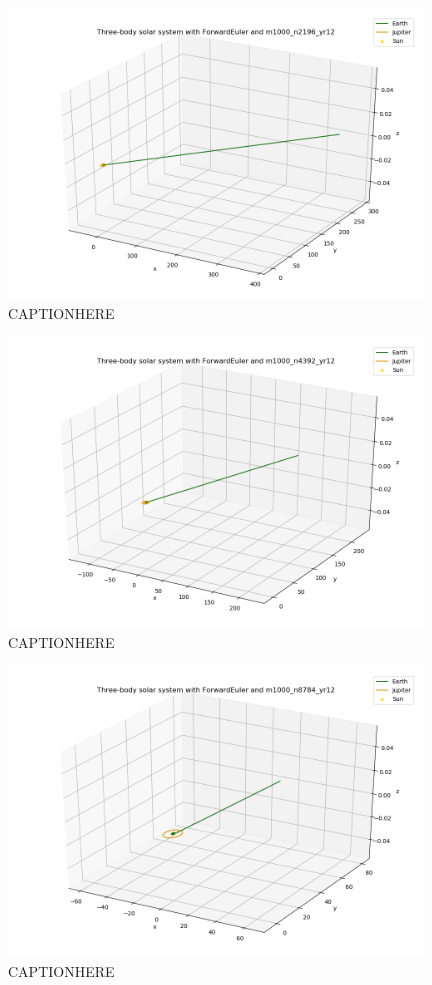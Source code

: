 \documentclass{article}
\begin{document}
    \begin{figure}[H]
        \centering
        \includegraphics[width = 11cm]{img/plot3D_S_E_J_F_m1000_n2196_yr12.png}
        \caption{CAPTIONHERE}
        \label{fig:plot3D_S_E_J_F_m1000_n2196_yr12}
    \end{figure}

    \begin{figure}[H]
        \centering
        \includegraphics[width = 11cm]{img/plot3D_S_E_J_F_m1000_n4392_yr12.png}
        \caption{CAPTIONHERE}
        \label{fig:plot3D_S_E_J_F_m1000_n4392_yr12}
    \end{figure}

    \begin{figure}[H]
        \centering
        \includegraphics[width = 11cm]{img/plot3D_S_E_J_F_m1000_n8784_yr12.png}
        \caption{CAPTIONHERE}
        \label{fig:plot3D_S_E_J_F_m1000_n8784_yr12}
    \end{figure}
\end{document}
